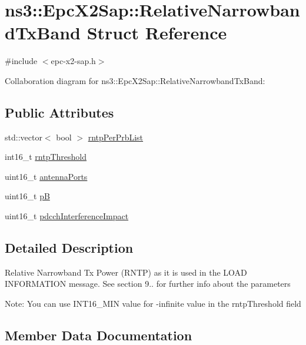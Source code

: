 \hypertarget{structns3_1_1EpcX2Sap_1_1RelativeNarrowbandTxBand}{}\section{ns3\+:\+:Epc\+X2\+Sap\+:\+:Relative\+Narrowband\+Tx\+Band Struct Reference}
\label{structns3_1_1EpcX2Sap_1_1RelativeNarrowbandTxBand}


{\ttfamily \#include $<$epc-\/x2-\/sap.\+h$>$}



Collaboration diagram for ns3\+:\+:Epc\+X2\+Sap\+:\+:Relative\+Narrowband\+Tx\+Band\+:
\subsection*{Public Attributes}
\begin{DoxyCompactItemize}
\item 
std\+::vector$<$ bool $>$ \hyperlink{structns3_1_1EpcX2Sap_1_1RelativeNarrowbandTxBand_a81b4e4130a84656a158c0f14ab123bdf}{rntp\+Per\+Prb\+List}
\item 
int16\+\_\+t \hyperlink{structns3_1_1EpcX2Sap_1_1RelativeNarrowbandTxBand_a06750a129be794295dbd7b537eb61c8a}{rntp\+Threshold}
\item 
uint16\+\_\+t \hyperlink{structns3_1_1EpcX2Sap_1_1RelativeNarrowbandTxBand_a5f2adbdfa9c2ee2f0336bf5a3bdff015}{antenna\+Ports}
\item 
uint16\+\_\+t \hyperlink{structns3_1_1EpcX2Sap_1_1RelativeNarrowbandTxBand_af56c95b2ac839ce14e4e61f536b1dfe9}{pB}
\item 
uint16\+\_\+t \hyperlink{structns3_1_1EpcX2Sap_1_1RelativeNarrowbandTxBand_ae3398d70a6c85cede108c4a915a321ff}{pdcch\+Interference\+Impact}
\end{DoxyCompactItemize}


\subsection{Detailed Description}
Relative Narrowband Tx Power (R\+N\+TP) as it is used in the L\+O\+AD I\+N\+F\+O\+R\+M\+A\+T\+I\+ON message. See section 9.. for further info about the parameters

Note\+: You can use I\+N\+T16\+\_\+\+M\+IN value for -\/infinite value in the rntp\+Threshold field 

\subsection{Member Data Documentation}
